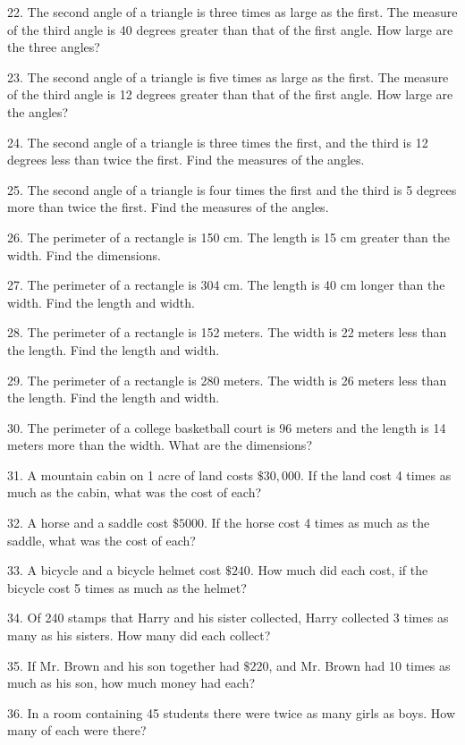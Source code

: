 \documentclass[11pt]{book}
\theoremstyle{definition}  %
\begin{document}
22. The second angle of a triangle is three times as large as the first. The
measure of the third angle is 40 degrees greater than that of the
first angle. How large are the three angles?

23. The second angle of a triangle is five times as large as the first. The
measure of the third angle is 12 degrees greater than that of
the first angle. How large are the angles?

24. The second angle of a triangle is three times the first, and the third is
12 degrees less than twice the first. Find the
measures of the angles.

25. The second angle of a triangle is four times the first and the third is 5
degrees more than twice the first. Find the measures of the angles.

26. The perimeter of a rectangle is 150 cm. The length is 15 cm greater than
the width. Find the dimensions.

27. The perimeter of a rectangle is 304 cm. The length is 40 cm longer than
the width. Find the length and width.

28. The perimeter of a rectangle is 152 meters. The width is 22 meters less
than the length. Find the length and width.

29. The perimeter of a rectangle is 280 meters. The width is 26 meters less
than the length. Find the length and width.

30. The perimeter of a college basketball court is 96 meters and the length is
14 meters more than the width. What are the dimensions?

31. A mountain cabin on 1 acre of land costs $\$30,000$. If the land
cost 4 times as much as the cabin, what was the cost of each?

32. A horse and a saddle cost $\$5000$. If the horse cost 4 times as
much as the saddle, what was the cost of each?

33. A bicycle and a bicycle helmet cost $\$240$. How much did each
cost, if the bicycle cost 5 times as much as the helmet?

34. Of 240 stamps that Harry and his sister collected, Harry collected 3 times
as many as his sisters. How many did each collect?

35. If Mr. Brown and his son together had $\$220$, and Mr. Brown had
10 times as much as his son, how much money had each?

36. In a room containing 45 students there were twice as many girls as boys.
How many of each were there?
\end{document}
